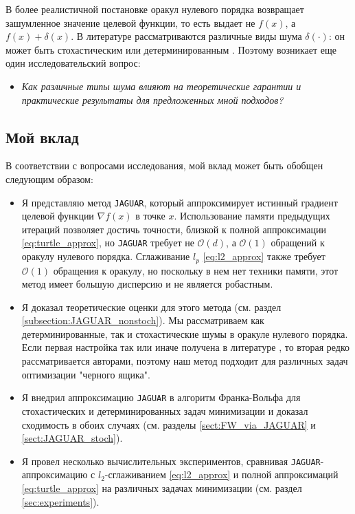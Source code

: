    В более реалистичной постановке оракул нулевого порядка возвращает зашумленное значение целевой функции, то есть выдает не $f(x)$, а $f(x) + \delta(x)$. В литературе рассматриваются различные виды шума $\delta(\cdot)$: он может быть стохастическим \cite{bach2016highly, doi:10.1137/19M1259225, akhavan2020exploiting, gasnikov2022power} или детерминированным \cite{risteski2016algorithms, bogolubsky2016learning, sahu2018distributed, bayandina2018gradient, dvinskikh2022noisy, lobanov2023non}. Поэтому возникает еще один исследовательский вопрос:

    \begin{itemize}
        \item \textit{Как различные типы шума влияют на теоретические гарантии и практические результаты для предложенных мной подходов?}
    \end{itemize}

\subsection{Мой вклад}
    
    В соответствии с вопросами исследования, мой вклад может быть обобщен следующим образом:

    \begin{itemize}
        \item Я представляю метод \texttt{JAGUAR}, который аппроксимирует истинный градиент целевой функции $\nabla f(x)$ в точке $x$. Использование памяти предыдущих итераций позволяет достичь точности, близкой к полной аппроксимации \eqref{eq:turtle_approx}, но \texttt{JAGUAR} требует не $\mathcal{O}(d)$, а $\mathcal{O}(1)$ обращений к оракулу нулевого порядка. Сглаживание $l_p$ \eqref{eq:l2_approx} также требует $\mathcal{O}(1)$ обращения к оракулу, но поскольку в нем нет техники памяти, этот метод имеет большую дисперсию и не является робастным.
        \item Я доказал теоретические оценки для этого метода (см. раздел \ref{subsection:JAGUAR_nonstoch}). Мы рассматриваем как детерминированные, так и стохастические шумы в оракуле нулевого порядка. Если первая настройка так или иначе получена в литературе \cite{lobanov2023zero, lobanov2023non}, то вторая редко рассматривается авторами, поэтому наш метод подходит для различных задач оптимизации "черного ящика".
        \item Я внедрил аппроксимацию \texttt{JAGUAR} в алгоритм Франка-Вольфа для стохастических и детерминированных задач минимизации и доказал сходимость в обоих случаях (см. разделы \ref{sect:FW_via_JAGUAR} и \ref{sect:JAGUAR_stoch}). 
        \item Я провел несколько вычислительных экспериментов, сравнивая \texttt{JAGUAR}-аппроксимацию с $l_2$-сглаживанием \eqref{eq:l2_approx} и полной аппроксимаций \eqref{eq:turtle_approx} на различных задачах минимизации (см. раздел \ref{sec:experiments}).
    \end{itemize}

